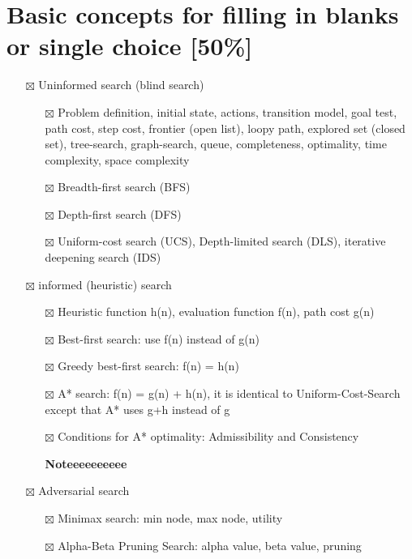 \documentclass[11pt]{article}
\begin{document}
\section{Basic concepts for filling in blanks or single choice [50\%]}
\label{sec:orgd3a02b9}
\begin{itemize}
\item[{$\boxtimes$}] Uninformed search (blind search)
\begin{itemize}
\item[{$\boxtimes$}] Problem definition, initial state, actions, transition model, goal
test, path cost, step cost, frontier (open list), loopy path, explored set
(closed set), tree-search, graph-search, queue, completeness, optimality,
time complexity, space complexity
\item[{$\boxtimes$}] Breadth-first search (BFS)
\item[{$\boxtimes$}] Depth-first search (DFS)
\item[{$\boxtimes$}] Uniform-cost search (UCS), Depth-limited search (DLS), iterative
deepening search (IDS)
\end{itemize}
\item[{$\boxtimes$}] informed (heuristic) search
\begin{itemize}
\item[{$\boxtimes$}] Heuristic function h(n), evaluation function f(n), path cost g(n)
\item[{$\boxtimes$}] Best-first search: use f(n) instead of g(n)
\item[{$\boxtimes$}] Greedy best-first search: f(n) = h(n)
\item[{$\boxtimes$}] A* search: f(n) = g(n) + h(n), it is identical to Uniform-Cost-Search
except that A* uses g+h instead of g
\item[{$\boxtimes$}] Conditions for A* optimality: Admissibility and Consistency

\textbf{Noteeeeeeeeee}
\end{itemize}
\item[{$\boxtimes$}] Adversarial search
\begin{itemize}
\item[{$\boxtimes$}] Minimax search: min node, max node, utility
\item[{$\boxtimes$}] Alpha-Beta Pruning Search: alpha value, beta value, pruning


\end{itemize}
\end{itemize}
\end{document}
